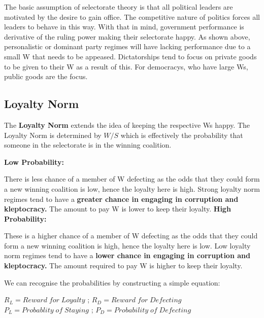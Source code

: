 \documentclass[12pt, letterpaper]{article}
\begin{document}
The basic assumption of selectorate theory is that all political leaders are motivated by the desire to gain office. The competitive nature of politics forces all leaders to behave in this way. With that in mind, government performance is derivative of the ruling power making their selectorate happy. As shown above, personalistic or dominant party regimes will have lacking performance due to a small W that needs to be appeased. Dictatorships tend to focus on private goods to be given to their W as a result of this. For democracys, who have large Ws, public goods are the focus.

\subsection{Loyalty Norm}
The \textbf{Loyalty Norm} extends the idea of keeping the respective Ws happy. The Loyalty Norm is determined by $W/S$ which is effectively the probability that someone in the selectorate is in the winning coalition.

\textbf{Low Probability:}

There is less chance of a member of W defecting as the odds that they could form a new winning coalition is low, hence the loyalty here is high. Strong loyalty norm regimes tend to have a \textbf{greater chance in engaging in corruption and kleptocracy.} The amount to pay W is lower to keep their loyalty.
\textbf{High Probability:}

These is a higher chance of a member of W defecting as the odds that they could form a new winning coalition is high, hence the loyalty here is low. Low loyalty norm regimes tend to have a \textbf{lower chance in engaging in corruption and kleptocracy.} The amount required to pay W is higher to keep their loyalty. 

\begin{center}

We can recognise the probabilities by constructing a simple equation:

$R_L = Reward\;for\;Loyalty$ ;
$R_D = Reward\;for\;Defecting$ \\
$P_L = Probablity\;of\;Staying$ ;
$P_D = Probability\;of\;Defecting$ \\

\end{center}
\end{document}
